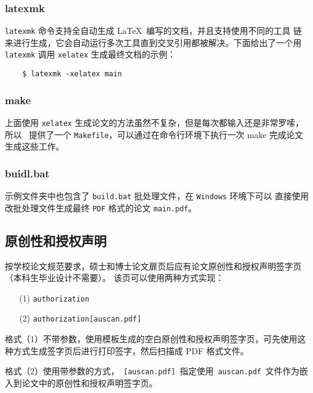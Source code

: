 \subsubsection{latexmk}
\label{sec:latexmk}

\texttt{latexmk} 命令支持全自动生成 \LaTeX\ 编写的文档，并且支持使用不同的工具
链来进行生成，它会自动运行多次工具直到交叉引用都被解决。下面给出了一个用
\texttt{latexmk} 调用 \texttt{xelatex} 生成最终文档的示例：

\begin{lstlisting}
    $ latexmk -xelatex main
\end{lstlisting}

\subsubsection{make}
\label{sec:make}

上面使用 \texttt{xelatex} 生成论文的方法虽然不复杂，但是每次都输入还是非常罗嗦，所以 \heuthesis\
提供了一个 \texttt{Makefile}，可以通过在命令行环境下执行一次 make 完成论文生成这些工作。

\subsubsection{buidl.bat}
\label{sec:build}

示例文件夹中也包含了 \texttt{build.bat} 批处理文件，在 \texttt{Windows} 环境下可以
直接使用改批处理文件生成最终 \texttt{PDF} 格式的论文 \texttt{main.pdf}。

\subsection{原创性和授权声明}
\label{sec:generate-auth}

按学校论文规范要求，硕士和博士论文扉页后应有论文原创性和授权声明签字页（本科生毕业设计不需要）。
该页可以使用两种方式实现：

\begin{enumerate}
  \item[(1)] \texttt{\cs authorization}
  \item[(2)] \texttt{\cs authorization[auscan.pdf]}
\end{enumerate}

格式（1）不带参数，使用模板生成的空白原创性和授权声明签字页，可先使用这种方式生成签字页后进行打印签字，然后扫描成 PDF 格式文件。

格式（2）使用带参数的方式，~\texttt{[auscan.pdf]}~指定使用~\texttt{auscan.pdf}~文件作为嵌入到论文中的原创性和授权声明签字页。

